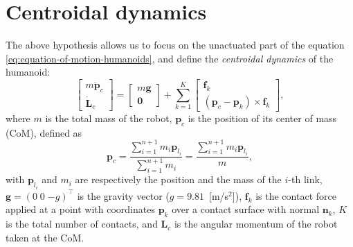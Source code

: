 \section{Centroidal dynamics}
The above hypothesis allows us to focus on the unactuated part of the equation
\eqref{eq:equation-of-motion-humanoids}, and define the
\textit{centroidal dynamics} \cite{Orin2013CentroidalDynamics} of the humanoid:
\begin{equation}
    \label{eq:centroidal-dynamics}
    \begin{bmatrix}
        m \ddot{\bm{p}}_c \\ \dot{\bm{L}}_c
    \end{bmatrix} =
    \begin{bmatrix}
        m \bm{g} \\ \bm{0}
    \end{bmatrix} +
    \sum_{k=1}^K
    \begin{bmatrix}
        \bm{f}_k \\ (\bm{p}_c - \bm{p}_k) \times \bm{f}_k
    \end{bmatrix},
\end{equation}
where $m$ is the total mass of the robot, $\bm{p}_c$ is the position of its
center of mass (CoM), defined as
\begin{equation*}
    \bm{p}_c =
    \frac{\sum_{i=1}^{n+1} m_i \bm{p}_{l_i}}{\sum_{i=1}^{n+1} m_i} =
    \frac{\sum_{i=1}^{n+1} m_i \bm{p}_{l_i}}{m},
\end{equation*}
with $\bm{p}_{l_i}$ and $m_i$ are respectively the position and the mass of the $i$-th link, 
$\bm{g} = (0 \; 0 \; {-g})^\top$ is the gravity vector ($g=9.81$~[m/s$^2$]), $\bm{f}_k$ is the contact force
applied at a point with coordinates $\bm{p}_k$ over a contact surface with normal
$\bm{n}_k$, $K$ is the total number of contacts, and $\bm{L}_c$ is the angular
momentum of the robot taken at the CoM.

